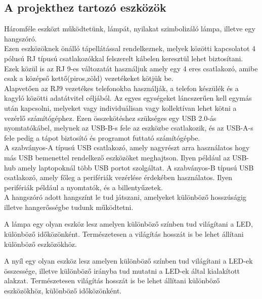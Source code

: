 \documentclass[tocnopagenum]{thesis-ekf}
\theoremstyle{definition}
\theoremstyle{remark}
\begin{document}
	\subsection{A projekthez tartozó eszközök}
	Háromféle eszközt működtetünk, lámpát, nyilakat szimbolizáló lámpa, illetve egy hangszóró.
	\\
	Ezen eszközöknek önálló tápellátással rendelkeznek, melyek közötti kapcsolatot 4 pólusú RJ típusú csatlakozókkal felszerelt kábelen keresztül lehet biztosítani. Ezek közül is az RJ 9-es változatát használjuk amely egy 4 eres csatlakozó, amibe csak a középső kettő(piros,zöld) vezetékeket kötjük be. \\
	Alapvetően az RJ9 vezetékes telefonokba használják, a telefon készülék és a kagyló közötti adatátvitel céljából.\cite{RJ9ok}
	Az egyes egységeket láncszerűen kell egymás után kapcsolni, melyeket vagy individuálisan vagy kollektívan lehet kötni a vezérlő számítógéphez. Ezen összekötéshez szükséges egy USB 2.0-ás nyomtatókábel, melynek az USB-B-s fele az eszközbe csatlakozik, és az USB-A-s fele pedig a tápot biztosító és programot futtató számítógépbe.
\\
	A szabványos-A típusú USB csatlakozó, amely nagyrészt arra használatos hogy más USB bemenettel rendelkező eszközöket meghajtson. Ilyen például az USB-hub amely laptopoknál több USB portot szolgáltat.
	A szabványos-B típusú USB csatlakozó, amely főleg a perifériák vezérlése érdekében használatos. Ilyen perifériák például a nyomtatók, és a billentyűzetek. \cite{typeab}
	\\  
	A hangszóró adott hangszínt le tud játszani, amelyeket különböző hosszúságig illetve hangerősségbe tudunk működtetni.
	\par
	A lámpa egy olyan eszköz lesz amelyen különböző színben tud világítani a LED, különböző időközönként. Természetesen a világítás hosszát is be lehet állítani különböző eszközökhöz.
	\par
	A nyíl egy olyan eszköz lesz amelyen különböző színben tud világítani a LED-ek összessége, illetve különböző irányba tud mutatni a LED-ek által kialakított alakzat.  Természetesen  világítás hosszát is be lehet állítani különböző eszközökhöz, különböző időközönként.
\end{document}
